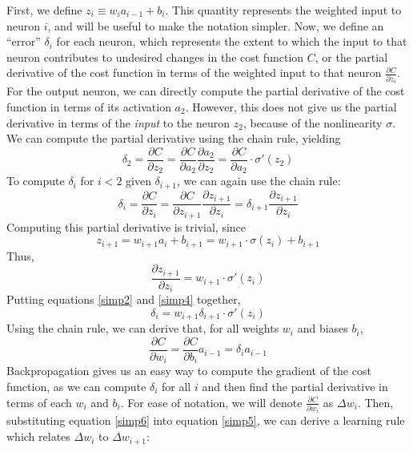\documentclass[12pt]{article}
\newcommand{\partialderiv}[2]{\frac{\partial #1}{\partial #2}}
\begin{document}
First, we define $z_i \equiv w_ia_{i-1} + b_i$. This quantity represents the weighted input to neuron $i$, and will be useful to make the notation simpler. Now, we define an ``error'' $\delta_i$ for each neuron, which represents the extent to which the input to that neuron contributes to undesired changes in the cost function $C$, or the partial derivative of the cost function in terms of the weighted input to that neuron $\partialderiv{C}{z_i}$. For the output neuron, we can directly compute the partial derivative of the cost function in terms of its activation $a_2$. However, this does not give us the partial derivative in terms of the \emph{input} to the neuron $z_2$, because of the nonlinearity $\sigma$. We can compute the partial derivative using the chain rule, yielding
\begin{equation}
	\delta_2 = \partialderiv{C}{z_2} = \partialderiv{C}{a_2}\partialderiv{a_2}{z_2} = \partialderiv{C}{a_2}\cdot\sigma'\left(z_2\right)
\end{equation}
To compute $\delta_i$ for $i < 2$ given $\delta_{i+1}$, we can again use the chain rule:
\begin{equation}
	\delta_i = \partialderiv{C}{z_i} = \partialderiv{C}{z_{i+1}}\partialderiv{z_{i+1}}{z_i} = \delta_{i+1}\partialderiv{z_{i+1}}{z_i}\label{simp2}
\end{equation}
Computing this partial derivative is trivial, since
\begin{equation}
	z_{i+1} = w_{i+1}a_i + b_{i+1} = w_{i+1}\cdot\sigma(z_i)+b_{i+1}
\end{equation}
Thus,
\begin{equation}
	\partialderiv{z_{i+1}}{z_i} = w_{i+1}\cdot\sigma'(z_i)\label{simp4}
\end{equation}
Putting equations \ref{simp2} and \ref{simp4} together,
\begin{equation}
	\delta_i  = w_{i+1}\delta_{i+1}\cdot\sigma'(z_i)\label{simp5}
\end{equation}
Using the chain rule, we can derive that, for all weights $w_i$ and biases $b_i$,
\begin{equation}
	\partialderiv{C}{w_i} = \partialderiv{C}{b_i}a_{i-1} = \delta_ia_{i-1}\label{simp6}
\end{equation}
Backpropagation gives us an easy way to compute the gradient of the cost function, as we can compute $\delta_i$ for all $i$ and then find the partial derivative in terms of each $w_i$ and $b_i$. For ease of notation, we will denote $\partialderiv{C}{w_i}$ as $\Delta w_i$. Then, substituting equation \ref{simp6} into equation \ref{simp5}, we can derive a learning rule which relates $\Delta w_i$ to $\Delta w_{i+1}$:
\end{document}
